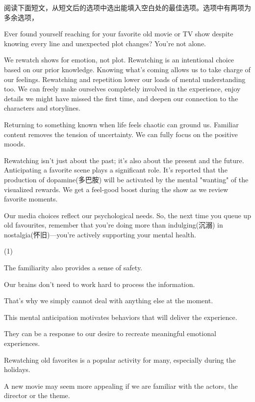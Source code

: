 \documentclass{英语试卷}
\begin{document}
\par 阅读下面短文，从短文后的选项中选出能填入空白处的最佳选项。选项中有两项为多余选项，\par
\par Ever found yourself reaching for your favorite old movie or TV show despite knowing every line and unexpected plot changes? You're not alone. \par
\par We rewatch shows for emotion, not plot. Rewatching is an intentional choice based on our prior knowledge. Knowing what's coming allows us to take charge of our feelings. Rewatching and repetition lower our loads of mental understanding too.  We can freely make ourselves completely involved in the experience, enjoy details we might have missed the first time, and deepen our connection to the characters and storylines.\par
\par {} Returning to something known when life feels chaotic can ground us. Familiar content removes the tension of uncertainty. We can fully focus on the positive moods.\par
\par Rewatching isn't just about the past; it's also about the present and the future. Anticipating a favorite scene plays a significant role. It's reported that the production of dopamine(多巴胺) will be activated by the mental "wanting" of the visualized rewards.  We get a feel-good boost during the show as we review favorite moments.\par
\par Our media choices reflect our psychological needs.  So, the next time you queue up old favourites, remember that you're doing more than indulging(沉溺) in nostalgia(怀旧)—you're actively supporting your mental health.\par
\begin{choices}(1)
  \item The familiarity also provides a sense of safety.
  \item Our brains don't need to work hard to process the information.
  \item That's why we simply cannot deal with anything else at the moment.
  \item This mental anticipation motivates behaviors that will deliver the experience.
  \item They can be a response to our desire to recreate meaningful emotional experiences.
  \item Rewatching old favorites is a popular activity for many, especially during the holidays.
  \item A new movie may seem more appealing if we are familiar with the actors, the director or the theme.
\end{choices}
\end{document}
